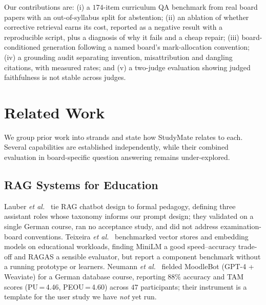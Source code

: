 \documentclass[conference]{IEEEtran}
\begin{document}
Our contributions are: (i) a $174$-item curriculum QA benchmark from real board
papers with an out-of-syllabus split for abstention; (ii) an ablation of whether
corrective retrieval earns its cost, reported as a negative result with a
reproducible script, plus a diagnosis of why it fails and a cheap repair;
(iii) board-conditioned generation following a named board's mark-allocation
convention; (iv) a grounding audit separating invention, misattribution and
dangling citations, with measured rates; and (v) a two-judge evaluation showing
judged faithfulness is not stable across judges.

\section{Related Work}
We group prior work into strands and state how StudyMate relates to each.
Several capabilities are established independently, while their combined
evaluation in board-specific question answering remains under-explored.

\subsection{RAG Systems for Education}
Lauber \textit{et al.}~\cite{lauber2025} tie RAG chatbot design to formal
pedagogy, defining three assistant roles whose taxonomy informs our prompt
design; they validated on a single German course, ran no acceptance study, and
did not address examination-board conventions. Teixeira \textit{et
al.}~\cite{teixeira2025} benchmarked vector stores and embedding models on
educational workloads, finding MiniLM a good speed--accuracy trade-off and
RAGAS a sensible evaluator, but report a component benchmark without a running
prototype or learners. Neumann \textit{et al.}~\cite{neumann2025} fielded
MoodleBot (GPT-4 + Weaviate) for a German database course, reporting $88\%$
accuracy and TAM scores (PU\,=\,4.46, PEOU\,=\,4.60) across $47$ participants;
their instrument is a template for the user study we have \emph{not} yet run.
\end{document}
